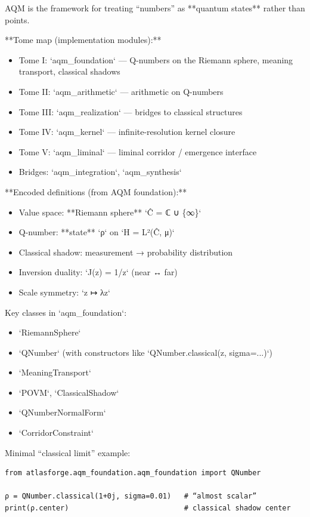 \documentclass[11pt]{article}
\begin{document}
AQM is the framework for treating “numbers” as **quantum states** rather than points.

**Tome map (implementation modules):**
\begin{itemize}
\item Tome I: `aqm\_foundation` — Q-numbers on the Riemann sphere, meaning transport, classical shadows
\item Tome II: `aqm\_arithmetic` — arithmetic on Q-numbers
\item Tome III: `aqm\_realization` — bridges to classical structures
\item Tome IV: `aqm\_kernel` — infinite-resolution kernel closure
\item Tome V: `aqm\_liminal` — liminal corridor / emergence interface
\item Bridges: `aqm\_integration`, `aqm\_synthesis`
\end{itemize}

**Encoded definitions (from AQM foundation):**
\begin{itemize}
\item Value space: **Riemann sphere** `Ĉ = ℂ ∪ \{∞\}`
\item Q-number: **state** `ρ` on `H = L²(Ĉ, μ)`
\item Classical shadow: measurement → probability distribution
\item Inversion duality: `J(z) = 1/z` (near ↔ far)
\item Scale symmetry: `z ↦ λz`
\end{itemize}

Key classes in `aqm\_foundation`:
\begin{itemize}
\item `RiemannSphere`
\item `QNumber` (with constructors like `QNumber.classical(z, sigma=...)`)
\item `MeaningTransport`
\item `POVM`, `ClassicalShadow`
\item `QNumberNormalForm`
\item `CorridorConstraint`
\end{itemize}

Minimal “classical limit” example:

\begin{lstlisting}
from atlasforge.aqm_foundation.aqm_foundation import QNumber

ρ = QNumber.classical(1+0j, sigma=0.01)   # “almost scalar”
print(ρ.center)                           # classical shadow center
\end{lstlisting}
\end{document}
